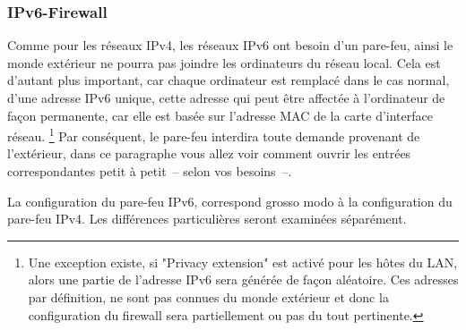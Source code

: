 \subsubsection{IPv6-Firewall}

Comme pour les réseaux IPv4, les réseaux IPv6 ont besoin d'un pare-feu, ainsi
le monde extérieur ne pourra pas joindre les ordinateurs du réseau local.
Cela est d'autant plus important, car chaque ordinateur est remplacé dans le cas
normal, d'une adresse IPv6 unique, cette adresse qui peut être affectée à
l'ordinateur de façon permanente, car elle est basée sur l'adresse MAC de la
carte d'interface réseau. \footnote{Une exception existe, si "Privacy extension"
est activé pour les hôtes du LAN, alors une partie de l'adresse IPv6 sera générée
de façon aléatoire. Ces adresses par définition, ne sont pas connues du monde
extérieur et donc la configuration du firewall sera partiellement ou pas du tout
pertinente.} Par conséquent, le pare-feu interdira toute demande provenant de
l'extérieur, dans ce paragraphe vous allez voir comment ouvrir les entrées
correspondantes petit à petit~-- selon vos besoins~--.

La configuration du pare-feu IPv6, correspond grosso modo à la configuration du
pare-feu IPv4. Les différences particulières seront examinées séparément.

